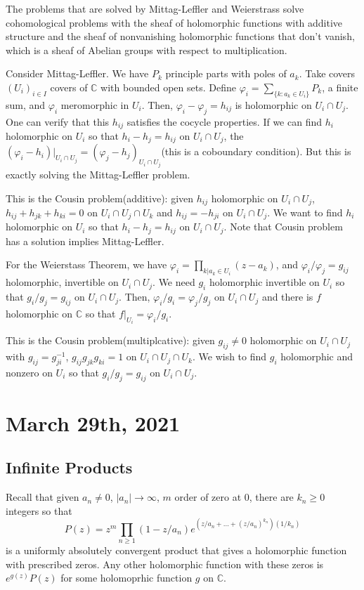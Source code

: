 \documentclass[12pt]{scrartcl}
\newcommand{\C}{\mathbb C}
\let \phi \varphi
\begin{document}
The problems that are solved by Mittag-Leffler and Weierstrass solve cohomological problems with the sheaf of holomorphic functions with additive structure and the sheaf of nonvanishing holomorphic functions that don't vanish, which is a sheaf of Abelian groups with respect to multiplication.  

Consider Mittag-Leffler.  We have $P_k$ principle parts with poles of $a_k$.  Take covers $(U_i)_{i \in I}$ covers of $\C$ with bounded open sets.   Define $\phi_i = \sum_{\{k: a_k \in U_i\}} P_k$, a finite sum, and $\phi_i$ meromorphic in $U_i$.  Then, $\phi_i - \phi_j = h_{ij}$ is holomorphic on $U_i \cap U_j$.   One can verify that this $h_{ij}$ satisfies the cocycle properties. If we can find $h_i$ holomorphic on $U_i$ so that $h_i - h_j = h_{ij}$ on $U_i \cap U_j$, the $(\phi_i - h_i)\vert_{U_i \cap U_j} = (\phi_j - h_j)_{U_i \cap U_j}$(this is a coboundary condition).  But this is exactly solving the Mittag-Leffler problem.  

This is the Cousin problem(additive): given $h_{ij}$ holomorphic on $U_i \cap U_j$, $h_{ij} + h_{jk} + h_{ki} = 0$ on $U_i \cap U_j \cap U_k$ and $h_{ij} = -h_{ji}$ on $U_i \cap U_j$.  We want to find $h_i$ holomorphic on $U_i$ so that $h_i - h_j = h_{ij}$ on $U_i \cap U_j$.  Note that Cousin problem has a solution implies Mittag-Leffler.  

For the Weierstass Theorem, we have $\phi_i = \prod_{k | a_k \in U_i}(z- a_k)$, and $\phi_i/\phi_j = g_{ij}$ holomorphic, invertible on $U_i \cap U_j$.  We need $g_i$ holomorphic invertible on $U_i$ so that $g_i/g_j = g_{ij}$ on $U_i \cap U_j$. Then, $\phi_i/g_i = \phi_j/g_j$ on $U_i \cap U_j$ and there is $f$ holomorphic on $\C$ so that $f\vert_{U_i} = \phi_i/g_i$.  

This is the Cousin problem(multiplcative): given $g_{ij} \ne 0$ holomorphic on $U_i \cap U_j$ with $g_{ij} = g_{ji}^{-1}$, $g_{ij}g_{jk}g_{ki} = 1$ on $U_i \cap U_j \cap U_k$.  We wish to find $g_i$ holomorphic and nonzero on $U_i$ so that $g_i/g_j = g_{ij}$ on $U_i \cap U_j$.
\pagebreak
\section{March 29th, 2021}
\subsection{Infinite Products}
Recall that given $a_n \ne 0$, $|a_n| \to \infty$, $m$ order of zero at $0$, there are $k_n \ge 0$ integers so that $$P(z) = z^m \prod_{n \ge 1} (1 - z/a_n) e^{(z/a_n + \dots + (z/a_n)^{k_n} )( 1/k_n)}$$
is a uniformly absolutely convergent product that gives a holomorphic function with prescribed zeros.  Any other holomorphic function with these zeros is $e^{g(z)}P(z)$ for some holomoprhic function $g$ on $\C$.
\end{document}
